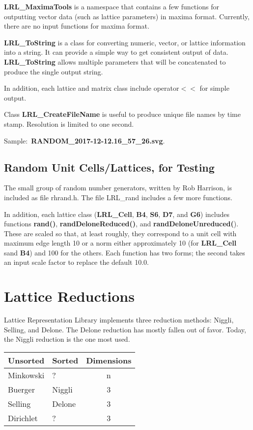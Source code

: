 \documentclass[11pt]{article} %
\begin{document}
\textbf{LRL\_MaximaTools} is a namespace that contains a few functions for outputting vector data (such as lattice parameters) in maxima format. Currently, there are no input functions for maxima format.

\textbf{LRL\_ToString} is a class for converting numeric, vector, or lattice information into a string. It can provide a simple way to get consistent output of data. \textbf{LRL\_ToString}  allows multiple parameters that will be concatenated to produce the single output string.

In addition, each lattice and matrix class include operator$<<$ for simple output.

Class \textbf{LRL\_CreateFileName} is useful to produce unique file names by time stamp. Resolution is limited to one second.

Sample$\colon$ \mbox{\textbf{RANDOM\_2017-12-12.16\_57\_26.svg}}.

\subsection{Random Unit Cells/Lattices, for Testing}


The small group of random number generators, written by Rob Harrison, is included as file rhrand.h. The file LRL\_rand includes a few more functions.

In addition, each lattice class (\textbf{LRL\_Cell}, \textbf{B4}, \textbf{S6}, \textbf{D7}, and \textbf{G6}) includes functions \textbf{rand()}, \textbf{randDeloneReduced()}, and \textbf{randDeloneUnreduced(}). These are scaled so that, at least roughly, they correspond to a unit cell with maximum edge length 10 or a norm either approximately 10 (for \textbf{LRL\_Cell} sand \textbf{B4}) and 100 for the others. Each function has two forms; the second takes an input scale factor to replace the default 10.0.

\section{Lattice Reductions}

Lattice Representation Library implements three reduction methods: Niggli, Selling, and Delone. The Delone reduction has mostly fallen out of favor. Today, the Niggli reduction is the one most used. 

\begin{center}
\begin{tabular}{|l|l|c|} %
\hline %
Unsorted & Sorted & Dimensions \\
\hline
Minkowski & ? & n \\
Buerger & Niggli & 3 \\
Selling & Delone & 3 \\
Dirichlet & ? & 3 \\
\hline
\end{tabular}
\end{center}
\end{document}
